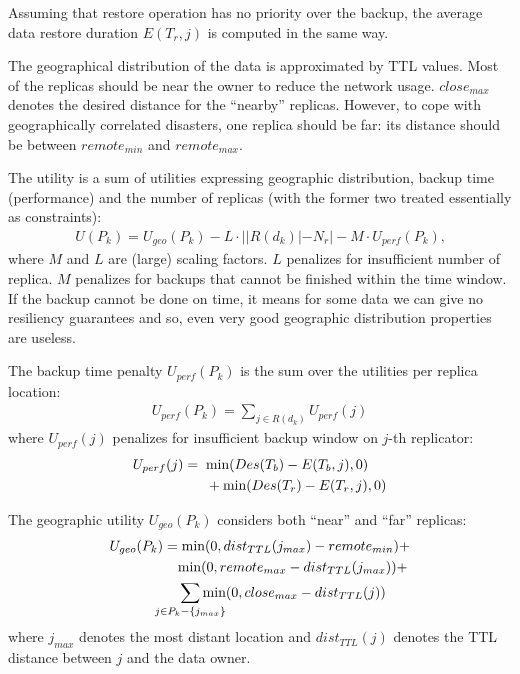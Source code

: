 \documentclass[10pt, final, conference, letterpaper]{IEEEtran}
\begin{document}
Assuming that restore operation has no priority over the backup, the average data restore duration $E(T_r, j)$ is computed in the same way.

The geographical distribution of the data is approximated by TTL values. Most of the replicas should be near the owner to reduce the network usage. $close_{max}$ denotes the desired distance for the ``nearby'' replicas. However, to cope with geographically correlated disasters, one replica should be far: its distance should be between $remote_{min}$ and $remote_{max}$.

The utility is a sum of utilities expressing geographic distribution, backup time (performance) and the number of replicas (with the former two treated essentially as constraints):
\begin{align}\label{eq::utility}
U(P_k) =  U_{geo}(P_k) - L \cdot ||R(d_k)| - N_{r}| - M \cdot U_{perf}(P_k) \text{,}
\end{align}
where $M$ and $L$ are (large) scaling factors. $L$ penalizes for insufficient number of replica. $M$ penalizes for backups that cannot be finished within the time window. If the backup cannot be done on time, it means for some data we can give no resiliency guarantees and so, even very good geographic distribution properties are useless.

The backup time penalty $U_{perf}(P_k)$ is the sum over the utilities per replica location:
\begin{align*}
U_{perf}(P_k) = \sum_{j \in R(d_k)}U_{perf}(j)
\end{align*}
where $U_{perf}(j)$ penalizes for insufficient backup window on $j$-th replicator:
\begin{align*}
U_{perf}(j) = \;\; & \textnormal{min}(Des(T_b) - E(T_b, j), 0) \\
& + \textnormal{min}(Des(T_r) - E(T_r, j), 0)
\end{align*}

The geographic utility $U_{geo}(P_k)$ considers both ``near'' and ``far'' replicas:
\begin{align*}
U_{geo}(P_k) =& \;\textnormal{min}(0, dist_{TTL}(j_{max}) - remote_{min}) + \\
& \textnormal{min}(0, remote_{max} - dist_{TTL}(j_{max})) +\\
& \sum_{\mathclap{j \in P_k - \{j_{max}\}}}\textnormal{min}(0, close_{max} - dist_{TTL}(j))
\end{align*}
where $j_{max}$ denotes the most distant location and $dist_{TTL}(j)$ denotes the TTL distance between $j$ and the data owner. 
\end{document}
